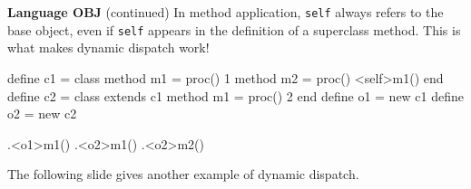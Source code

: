 \begin{minipage}[t]{\sw}
\slidenumber
\LARGE
{\bf Language OBJ} (continued)\exx
In method application, \verb'self' always refers to the base object,
even if \verb'self' appears in the definition of a superclass method.
This is what makes dynamic dispatch work!
\Large
\begin{qv}
define c1 =
  class
    method m1 = proc() 1
    method m2 = proc() <self>m1()
  end
define c2 =
  class extends c1
    method m1 = proc() 2
  end
define o1 = new c1
define o2 = new c2

.<o1>m1() %
.<o2>m1() %
.<o2>m2() %
\end{qv}
\LARGE
The following slide gives another example of dynamic dispatch.
\end{minipage}
